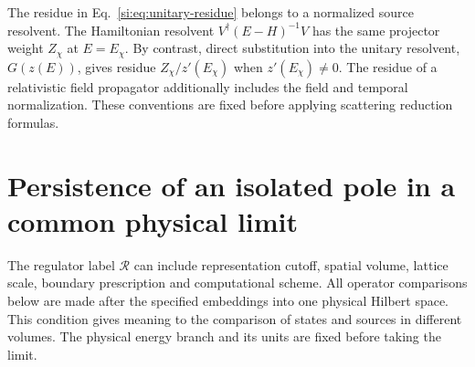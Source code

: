 \documentclass[11pt,a4paper]{article}
\begin{document}
The residue in Eq.~\eqref{si:eq:unitary-residue} belongs to a normalized source resolvent. The Hamiltonian resolvent $V^\dagger(E-H)^{-1}V$ has the same projector weight $Z_\chi$ at $E=E_\chi$. By contrast, direct substitution into the unitary resolvent, $G(z(E))$, gives residue $Z_\chi/z'(E_\chi)$ when $z'(E_\chi)\ne0$. The residue of a relativistic field propagator additionally includes the field and temporal normalization. These conventions are fixed before applying scattering reduction formulas.

\section{Persistence of an isolated pole in a common physical limit}
\label{si:continuum}
The regulator label $\mathcal R$ can include representation cutoff, spatial volume, lattice scale, boundary prescription and computational scheme. All operator comparisons below are made after the specified embeddings into one physical Hilbert space. This condition gives meaning to the comparison of states and sources in different volumes. The physical energy branch and its units are fixed before taking the limit.
\end{document}
